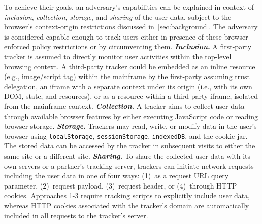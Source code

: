 %
%
To achieve their goals, an adversary's capabilities can be explained in context of \textit{inclusion}, \textit{collection}, \textit{storage}, and \textit{sharing} of the user data, subject to the browser's context-origin restrictions discussed in~\autoref{sec:background}.
%
The adversary is considered capable enough to track users either in presence of these browser-enforced policy restrictions or by circumventing them.
%
\textbf{\textit{Inclusion}.} 
%
A first-party tracker is assumed to directly monitor user activities within the top-level browsing context.
%
A third-party tracker could be embedded as an inline resource (e.g., image/script tag) within the mainframe by the first-party assuming trust delegation, an iframe with a separate context under its origin (i.e., with its own DOM, state, and resources), or as a resource within a third-party iframe, isolated from the mainframe context. 
%
%
\textbf{\textit{Collection}.}
%
A tracker aims to collect user data through available browser features by either executing JavaScript code or reading browser storage.
%
\textbf{\textit{Storage}.}
%
Trackers may read, write, or modify data in the user's browser using \texttt{localStorage}, \texttt{sessionStorage}, \texttt{indexedDB}, and the cookie jar.
%
The stored data can be accessed by the tracker in subsequent visits to either the same site or a different site.
%
\textbf{\textit{Sharing}.}
%
To share the collected user data with its own servers or a partner's tracking server, trackers can initiate network requests including the user data in one of four ways: (1)~as a request URL query parameter, (2)~request payload, (3)~request header, or (4)~through HTTP cookies.
%
Approaches 1-3 require tracking scripts to explicitly include user data, whereas HTTP cookies associated with the tracker's domain are automatically included in all requests to the tracker's server. %
%


